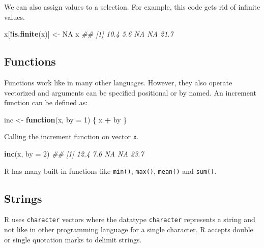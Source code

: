 \documentclass[
  notitlepage]{book}
\newenvironment{Shaded}{\begin{snugshade}}{\end{snugshade}}
\newcommand{\CommentTok}[1]{\textcolor[rgb]{0.56,0.35,0.01}{\textit{#1}}}
\newcommand{\ControlFlowTok}[1]{\textcolor[rgb]{0.13,0.29,0.53}{\textbf{#1}}}
\newcommand{\DataTypeTok}[1]{\textcolor[rgb]{0.13,0.29,0.53}{#1}}
\newcommand{\DecValTok}[1]{\textcolor[rgb]{0.00,0.00,0.81}{#1}}
\newcommand{\KeywordTok}[1]{\textcolor[rgb]{0.13,0.29,0.53}{\textbf{#1}}}
\newcommand{\NormalTok}[1]{#1}
\newcommand{\OperatorTok}[1]{\textcolor[rgb]{0.81,0.36,0.00}{\textbf{#1}}}
\newcommand{\OtherTok}[1]{\textcolor[rgb]{0.56,0.35,0.01}{#1}}
\newcommand{\StringTok}[1]{\textcolor[rgb]{0.31,0.60,0.02}{#1}}
\begin{document}
We can also assign values to a selection. For example, this code gets rid of
infinite values.

\begin{Shaded}
\begin{Highlighting}[]
\NormalTok{x[}\OperatorTok{!}\KeywordTok{is.finite}\NormalTok{(x)] \textless{}{-}}\StringTok{ }\OtherTok{NA}
\NormalTok{x}
\CommentTok{\#\# [1] 10.4  5.6   NA   NA 21.7}
\end{Highlighting}
\end{Shaded}

\hypertarget{functions}{%
\subsection{Functions}\label{functions}}

Functions work like in many other languages. However, they also operate
vectorized and arguments can be specified positional or by named. An
increment function can be defined as:

\begin{Shaded}
\begin{Highlighting}[]
\NormalTok{inc \textless{}{-}}\StringTok{ }\ControlFlowTok{function}\NormalTok{(x, }\DataTypeTok{by =} \DecValTok{1}\NormalTok{) \{ }
\NormalTok{    x }\OperatorTok{+}\StringTok{ }\NormalTok{by }
\NormalTok{  \}}
\end{Highlighting}
\end{Shaded}

Calling the increment function on vector \texttt{x}.

\begin{Shaded}
\begin{Highlighting}[]
\KeywordTok{inc}\NormalTok{(x, }\DataTypeTok{by =} \DecValTok{2}\NormalTok{)}
\CommentTok{\#\# [1] 12.4  7.6   NA   NA 23.7}
\end{Highlighting}
\end{Shaded}

R has many built-in functions like \texttt{min()}, \texttt{max()}, \texttt{mean()} and
\texttt{sum()}.

\hypertarget{strings}{%
\subsection{Strings}\label{strings}}

R uses \texttt{character} vectors where the datatype \texttt{character} represents a string
and not like in other programming language for a single character.
R accepts double or single quotation marks to delimit strings.
\end{document}
